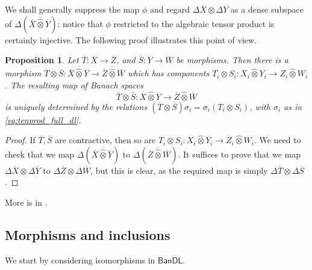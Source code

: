\documentclass[a4paper,11pt]{article}
\theoremstyle{plain}
\newtheorem{proposition}{Proposition}[section]
\theoremstyle{remark}
\newcommand{\msf}[1]{\mathsf{#1}}
\newcommand{\proten}{\widehat\otimes}
\begin{document}
We shall generally suppress the map $\phi$ and regard $\Delta\overline X \otimes \Delta\overline Y$ as a dense subspace of $\Delta(\overline X \overline{\proten} \overline Y)$: notice that $\phi$ restricted to the algebraic tensor product is certainly injective.  The following proof illustrates this point of view.

\begin{proposition}\label{prop:tenprod_morphisms}
Let $\overline T \colon \overline X \to \overline Z$, and $\overline S \colon \overline Y \to \overline W$ be morphisms.  Then there is a morphism $\overline T \otimes \overline S \colon \overline X \overline{\proten} \overline Y \to \overline Z \overline{\proten} \overline W$ which has components $T_i\otimes S_i \colon X_i\proten Y_i \to Z_i\proten W_i$.  The resulting map of Banach spaces
\[ \overline T \otimes \overline S \colon \overline X \proten \overline Y \to \overline Z \proten \overline W \]
is uniquely determined by the relations $(\overline T \otimes \overline S) \sigma_i = \sigma_i (T_i \otimes S_i)$, with $\sigma_i$ as in \eqref{eq:tenprod_full_dl}.
\end{proposition}
\begin{proof}
If $\overline T, \overline S$ are contractive, then so are $T_i\otimes S_i \colon X_i\proten Y_i \to Z_i\proten W_i$.  We need to check that we map $\Delta(\overline X \overline{\proten} \overline Y)$ to $\Delta(\overline Z \overline{\proten} \overline W)$.  It suffices to prove that we map $\Delta\overline X \otimes \Delta\overline Y$ to $\Delta\overline Z \otimes \Delta\overline W$, but this is clear, as the required map is simply $\Delta\overline T \otimes \Delta\overline S$.
\end{proof}

More is in \cite[Section IV.2]{KP_InterpolationFunctorsDuality}.


\subsection{Morphisms and inclusions}

We start by considering isomorphisms in $\msf{BanDL}$.
\end{document}
